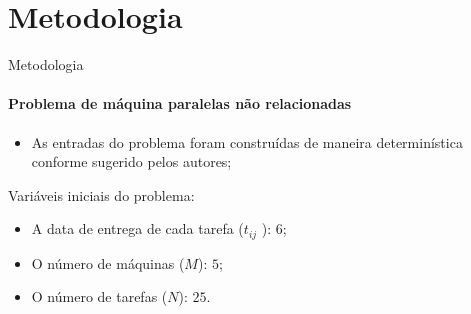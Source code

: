 \documentclass[]{beamer}
\begin{document}

\section{Metodologia}

	\begin{frame}{Metodologia}
		\framesubtitle{Problema de máquina paralelas não relacionadas}
		\begin{itemize}
			\item As entradas do problema foram construídas de maneira determinística conforme sugerido pelos autores;
		\end{itemize}	
			Variáveis iniciais do problema:
		\begin{itemize}
			\item A data de entrega de cada tarefa ($t_{ij} $ ): $6$;
    		\item O número de máquinas ($M$): $5$;
   			\item O número de tarefas ($N$): $25$. 
		\end{itemize}
	\end{frame}
\end{document}
